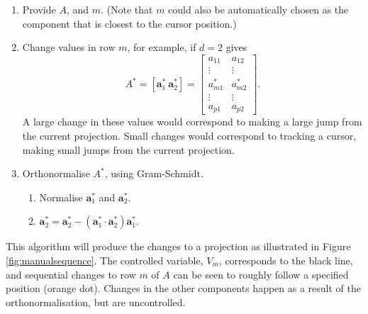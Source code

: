 \documentclass[]{interact}
\theoremstyle{plain}%
\theoremstyle{definition}
\theoremstyle{remark}
\def\tightlist{}
\begin{document}
\begin{enumerate}
\def\labelenumi{\arabic{enumi}.}
\tightlist
\item
  Provide \(A\), and \(m\). (Note that \(m\) could also be automatically
  chosen as the component that is closest to the cursor position.)
\item
  Change values in row \(m\), for example, if \(d=2\) gives \[
  A^* = [ \boldsymbol{a}^*_1~\boldsymbol{a}^*_2 ] = \left[ \begin{array}{cc} a_{11} & a_{12}\\
                             \vdots & \vdots \\
                             a^*_{m1} & a^*_{m2}\\
                             \vdots & \vdots \\
                             a_{p1} & a_{p2} 
       \end{array}\right].
  \] \noindent A large change in these values would correspond to making
  a large jump from the current projection. Small changes would
  correspond to tracking a cursor, making small jumps from the current
  projection.
\item
  Orthonormalise \(A^*\), using Gram-Schmidt.

  \begin{enumerate}
  \def\labelenumii{\roman{enumii}.}
  \tightlist
  \item
    Normalise \(\boldsymbol{a}^*_1\) and \(\boldsymbol{a}^*_2\).
  \item
    \(\boldsymbol{a}^*_2 = \boldsymbol{a}^*_2 - (\boldsymbol{a}^*_1\cdot\boldsymbol{a}^*_2)\boldsymbol{a}^*_1\).
  \end{enumerate}
\end{enumerate}

This algorithm will produce the changes to a projection as illustrated
in Figure \ref{fig:manualsequence}. The controlled variable, \(V_m\),
corresponds to the black line, and sequential changes to row \(m\) of
\(A\) can be seen to roughly follow a specified position (orange dot).
Changes in the other components happen as a result of the
orthonormalisation, but are uncontrolled.
\end{document}
